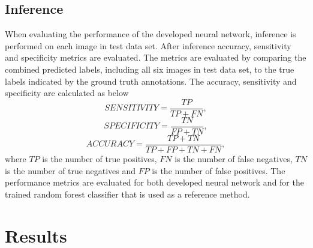 \documentclass[aps,prb,10pt,twocolumn,groupedaddress]{revtex4-1}
\begin{document}
\subsection{Inference}
\label{sec:computational_methods_inference}
When evaluating the performance of the developed neural network, inference is performed on each image in test data set. After inference accuracy, sensitivity and specificity metrics are evaluated. The metrics are evaluated by comparing the combined predicted labels, including all six images in test data set, to the true labels indicated by the ground truth annotations. The accuracy, sensitivity and specificity are calculated as below  
\begin{equation}
	SENSITIVITY = \frac{TP}{TP + FN},
	\label{eq:sensitivity}
\end{equation}
\begin{equation}
	SPECIFICITY = \frac{TN}{FP + TN},
	\label{eq:specifity}
\end{equation}
\begin{equation}
	ACCURACY = \frac{TP + TN}{TP + FP + TN + FN},
	\label{eq:accuracy}
\end{equation}
where $TP$ is the number of true positives, $FN$ is the number of false negatives, $TN$ is the number of true negatives and $FP$ is the number of false positives.
The performance metrics are evaluated for both developed neural network and for the trained random forest classifier that is used as a reference method.


\section{Results}
\label{sec:results}
\end{document}
